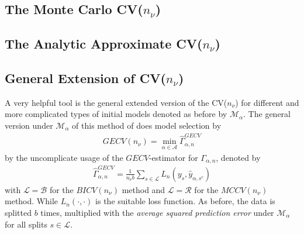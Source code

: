 \documentclass[Research_Module_ES.tex]{subfiles}
\begin{document}
	



\subsection{The Monte Carlo CV($n_\nu$)}

\subsection{The Analytic Approximate CV($n_\nu$)}

\subsection{General Extension of CV($n_\nu$)}
A very helpful tool is the general extended version of the CV($n_\nu$) for different and more complicated types of initial models denoted as before by $\mathcal{M}_\alpha$. The general version under $\mathcal{M}_\alpha$ of this method of \cite{shao} does model selection by 
\begin{align*}
	GECV(n_\nu)=\min_{\alpha\in\mathcal{A}}\hat{\Gamma}_{\alpha,n}^{GECV}
\end{align*}
by the uncomplicate usage of the $GECV$-estimator for $\Gamma_{\alpha,n}$, denoted by
\begin{align*}
	\hat{\Gamma}_{\alpha,n}^{GECV}=\frac{1}{n_\nu b}\sum_{s\in\mathcal{L}}L_n(y_s,\hat{y}_{\alpha,s^c})
\end{align*} 
with $\mathcal{L}=\mathcal{B}$ for the $BICV(n_\nu)$ method and $\mathcal{L}=\mathcal{R}$ for the $MCCV(n_\nu)$ method. While $L_n(\cdot,\cdot)$ is the suitable loss function. As before, the data is splitted $b$ times, multiplied with the \textit{average squared prediction error} under $\mathcal{M}_\alpha$ for all splits $s\in\mathcal{L}$.
\end{document}

